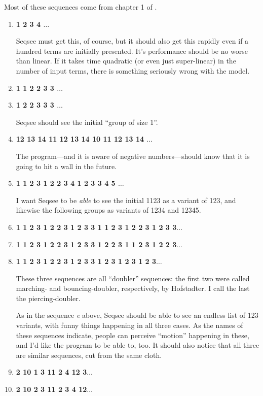 Most of these sequences come from chapter 1 of .

\renewcommand{\theenumi}{\alph{enumi}}
\begin{enumerate}
\item \textbf{1 2 3 4 $\ldots$}

Seqsee must get this, of course, but it should also get this rapidly even if a hundred terms are initially presented. It's performance should be no worse than linear. If it takes time quadratic (or even just super-linear) in the number of input terms, there is something seriously wrong with the model.

\item \textbf{ 1 1 2 2 3 3 $\ldots$}
\item \textbf{ 1 2 2 3 3 3 $\ldots$}

Seqsee should see the initial ``group of size 1''.

\item \textbf{12 13 14 11 12 13 14 10 11 12 13 14 $\ldots$}

The program---and it is aware of negative numbers---should know that it is going to hit a wall in the future.

\item \textbf{1 1 2 3 1 2 2 3 4 1 2 3 3 4 5 $\ldots$}

I want Seqsee to be \emph{able} to see the initial 1123 as a variant of 123, and likewise the following groups as variants of 1234 and 12345.

\item \textbf{1 1 2 3 1 2 2 3 1 2 3 3 1 1 2 3 1 2 2 3 1 2 3 3$\ldots$}
\item \textbf{1 1 2 3 1 2 2 3 1 2 3 3 1 2 2 3 1 1 2 3 1 2 2 3$\ldots$}
\item \textbf{1 1 2 3 1 2 2 3 1 2 3 3 1 2 3 1 2 3 1 2 3$\ldots$}

These three sequences are all ``doubler'' sequences: the first two were called marching- and bouncing-doubler, respectively, by Hofstadter. I call the last the piercing-doubler.

As in the sequence \emph{e} above, Seqsee should be able to see an endless list of 123 variants, with funny things happening in all three cases. As the names of these sequences indicate, people can perceive ``motion'' happening in these, and I'd like the program to be able to, too. It should also notice that all three are similar sequences, cut from the same cloth.

\item \textbf{ 2 10 1 3 11 2 4 12 3$\ldots$}
\item \textbf{ 2 10 2 3 11 2 3 4 12$\ldots$}


\end{enumerate}
